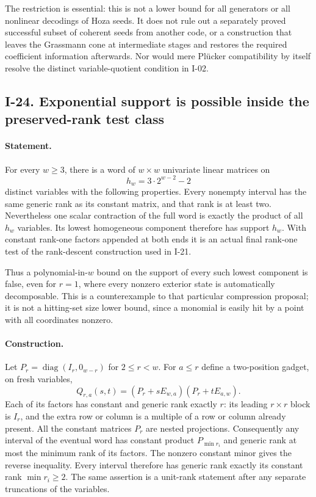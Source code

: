 \documentclass[11pt,a4paper]{article}
\theoremstyle{definition}\newtheorem{definition}{Definition}
\begin{document}
The restriction is essential: this is not a lower bound for
all generators or all nonlinear decodings of Hoza seeds.
It does not rule out a separately proved successful subset
of coherent seeds from another code, or a construction that
leaves the Grassmann cone at intermediate stages and restores
the required coefficient information afterwards.  Nor would
mere Pl\"ucker compatibility by itself resolve the distinct
variable-quotient condition in I-02.


\subsection{I-24. Exponential support is possible inside the preserved-rank test class}
\label{I-24}

\paragraph{Statement.}
For every $w\ge3$, there is a word of $w\times w$ univariate
linear matrices on
\[
 h_w=3\cdot2^{w-2}-2
 \tag{I.30}\label{eq:I-reset-support}
\]
distinct variables with the following properties.  Every
nonempty interval has the same generic rank as its constant
matrix, and that rank is at least two.  Nevertheless one scalar
contraction of the full word is exactly the product of all
$h_w$ variables.  Its lowest homogeneous component therefore
has support $h_w$.  With constant rank-one factors appended
at both ends it is an actual final rank-one test of the
rank-descent construction used in I-21.

Thus a polynomial-in-$w$ bound on the support of every such
lowest component is false, even for $r=1$, where every nonzero
exterior state is automatically decomposable.  This is a
counterexample to that particular compression proposal;
it is not a hitting-set size lower bound, since a monomial is
easily hit by a point with all coordinates nonzero.

\paragraph{Construction.}
Let $P_r=\operatorname{diag}(I_r,0_{w-r})$ for $2\le r<w$.
For $a\le r$ define a two-position gadget, on fresh variables,
\[
 Q_{r,a}(s,t)=(P_r+sE_{w,a})(P_r+tE_{a,w}).
\]
Each of its factors has constant and generic rank exactly $r$:
its leading $r\times r$ block is $I_r$, and the extra row or
column is a multiple of a row or column already present.
All the constant matrices $P_r$ are nested projections.
Consequently any interval of the eventual word has constant
product $P_{\min r_i}$ and generic rank at most the minimum
rank of its factors.  The nonzero constant minor gives the
reverse inequality.  Every interval therefore has generic
rank exactly its constant rank $\min r_i\ge2$.
The same assertion is a unit-rank statement after any separate
truncations of the variables.
\end{document}
